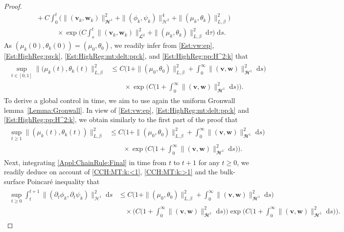 \documentclass[10pt,reqno]{amsart}
\theoremstyle{remark}
\numberwithin{equation}{section}
\newcommand{\norm}[1]{\| #1 \|}
\newcommand{\bv}{\mathbf{v}}
\newcommand{\bw}{\mathbf{w}}
\newcommand{\dtau}{\;\mathrm d\tau}
\newcommand{\ds}{\;\mathrm ds}
\newcommand{\delt}{\partial_{t}}
\begin{document}
\begin{proof}
\begin{align*}
    &\quad + C\int_0^t \Big(\norm{(\bv_k,\bw_k)}_{\mathbfcal{H}^1}^2 + \norm{(\phi_k,\psi_k)}_{\mathcal{H}^2}^4 + \norm{(\mu_k,\theta_k)}_{L,\beta}^2\Big)\\
    &\qquad\qquad\times\exp\Big(C\int_s^t \norm{(\bv_k,\bw_k)}_{\mathbfcal{L}^2}^2 + \norm{(\mu_k,\theta_k)}_{L,\beta}^2\dtau\Big)\ds \nonumber.
\end{align*}
As $(\mu_k(0),\theta_k(0)) = (\mu_0,\theta_0)$, we readily infer from \eqref{Est:vw:ep}, \eqref{Est:HighReg:pp:k}, \eqref{Est:HighReg:mt:delt:pp:k}, and \eqref{Est:HighReg:pp:H^2:k} that
\begin{align}\label{CCH:MT:k:<1}
    \begin{split}
        \sup_{t\in[0,1]}\norm{(\mu_k(t),\theta_k(t)}_{L,\beta}^2&\leq C\Big(1 + \norm{(\mu_0,\theta_0)}_{L,\beta}^2 + \int_0^\infty \norm{(\bv,\bw)}_{\mathbfcal{H}^1}^2\ds\Big)\\
        &\qquad\times\exp\Big(C\big(1 + \int_0^\infty \norm{(\bv,\bw)}_{\mathbfcal{H}^1}^2\ds\big)\Big).
    \end{split}
\end{align}
To derive a global control in time, we aim to use again the uniform Gronwall lemma~\ref{Lemma:Gronwall}. In view of \eqref{Est:vw:ep}, \eqref{Est:HighReg:mt:delt:pp:k} and \eqref{Est:HighReg:pp:H^2:k}, we obtain similarly to the first part of the proof that
\begin{align}\label{CCH:MT:k:>1}
    \begin{split}
        \sup_{t\geq 1}\norm{(\mu_k(t),\theta_k(t))}_{L,\beta}^2 &\leq C\Big(1 + \norm{(\mu_0,\theta_0)}_{L,\beta}^2 + \int_0^\infty \norm{(\bv,\bw)}_{\mathbfcal{H}^1}^2\ds\Big)\\
        &\qquad\times\exp\Big(C\big(1 + \int_0^\infty \norm{(\bv,\bw)}_{\mathbfcal{H}^1}^2\ds\big)\Big).
    \end{split}
\end{align}
Next, integrating \eqref{Appl:ChainRule:Final} in time from $t$ to $t+1$ for any $t\geq 0$, we readily deduce on account of \eqref{CCH:MT:k:<1}, \eqref{CCH:MT:k:>1} and the bulk-surface Poincar\'{e} inequality that
\begin{align}\label{CCH:PP:k}
    \begin{split}
        \sup_{t\geq0}\int_t^{t+1}\norm{(\delt\phi_k,\delt\psi_k)}_{\mathcal{H}^1}^2\ds &\leq C\Big(1 + \norm{(\mu_0,\theta_0)}_{L,\beta}^2 + \int_0^\infty \norm{(\bv,\bw)}_{\mathbfcal{H}^1}^2\ds\Big)\\
        &\quad\times\Big(C\big(1 + \int_0^\infty\norm{(\bv,\bw)}_{\mathbfcal{H}^1}^2\ds\big)\Big)\exp\Big(C\big(1 + \int_0^\infty \norm{(\bv,\bw)}_{\mathbfcal{H}^1}^2\ds\big)\Big).

\end{split}
\end{align}
\end{proof}
\end{document}
